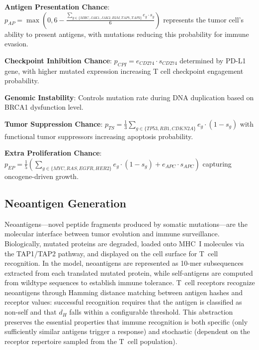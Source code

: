 \textbf{Antigen Presentation Chance}: $p_{AP} = \max(0, 6 - \frac{\sum_{g \in \{MHC,JAK1,JAK2,B2M,TAP1,TAP2\}} e_g \cdot s_g}{6})$ represents the tumor cell's ability to present antigens, with mutations reducing this probability for immune evasion.

\textbf{Checkpoint Inhibition Chance}: $p_{CPI} = e_{CD274} \cdot s_{CD274}$ determined by PD-L1 gene, with higher mutated expression increasing T cell checkpoint engagement probability.

\textbf{Genomic Instability}: Controls mutation rate during DNA duplication based on BRCA1 dysfunction level.

\textbf{Tumor Suppression Chance}: $p_{TS} = \frac{1}{3}\sum_{g \in \{TP53,RB1,CDKN2A\}} e_g \cdot (1-s_g)$ with functional tumor suppressors increasing apoptosis probability.

\textbf{Extra Proliferation Chance}: $p_{EP} = \frac{1}{5}(\sum_{g \in \{MYC,RAS,EGFR,HER2\}} e_g \cdot (1-s_g) + e_{APC} \cdot s_{APC})$ capturing oncogene-driven growth.

\FloatBarrier
\subsection{Neoantigen Generation}
\label{sec:neoantigens}

Neoantigens---novel peptide fragments produced by somatic mutations---are the molecular interface between tumor evolution and immune surveillance.  Biologically, mutated proteins are degraded, loaded onto MHC~I molecules via the TAP1/TAP2 pathway, and displayed on the cell surface for T~cell recognition.  In the model, neoantigens are represented as 10-mer subsequences extracted from each translated mutated protein, while self-antigens are computed from wildtype sequences to establish immune tolerance.  T~cell receptors recognize neoantigens through Hamming distance matching between antigen hashes and receptor values: successful recognition requires that the antigen is classified as non-self and that $d_H$ falls within a configurable threshold.  This abstraction preserves the essential properties that immune recognition is both specific (only sufficiently similar antigens trigger a response) and stochastic (dependent on the receptor repertoire sampled from the T~cell population).

